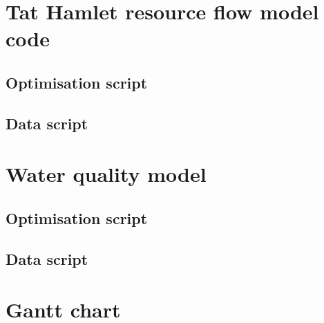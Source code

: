 \documentclass{article}
\begin{document}


\tableofcontents
\listoffigures
\listoftables





\appendix
\section{Tat Hamlet resource flow model code} \label{sec:code_tat}
\subsection{Optimisation script}

\clearpage
\subsection{Data script}

\section{Water quality model}
\subsection{Optimisation script}

\clearpage
\subsection{Data script}

\section{Gantt chart}




\end{document}

